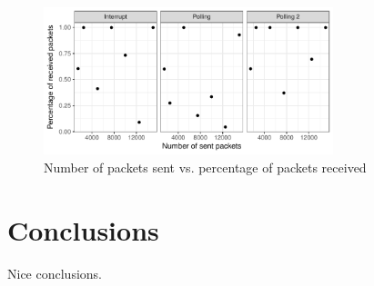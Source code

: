 \documentclass{article}
\begin{document}
\begin{figure}[H]
    \centering
    \includegraphics[width=0.75\textwidth]{number_packets_vs_percentage_received.pdf}
    \caption{Number of packets sent vs. percentage of packets received}
    \label{fig:percentage_received}
\end{figure}

\section{Conclusions}

Nice conclusions.


\printbibliography
\end{document}
